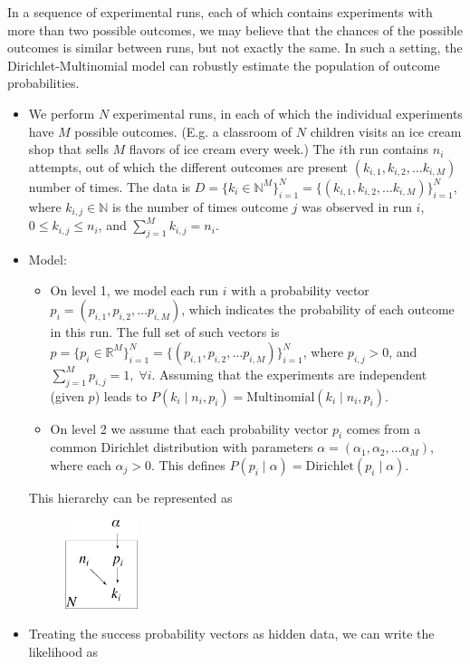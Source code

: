 In a sequence of experimental runs, each of which contains experiments with more than two possible outcomes, we may believe that the chances of the possible outcomes is similar between runs, but not exactly the same. In such a setting, the Dirichlet-Multinomial model can robustly estimate the population of outcome probabilities.
\begin{itemize}
	\item We perform $N$ experimental runs, in each of which the individual experiments have $M$ possible outcomes. (E.g. a classroom of $N$ children visits an ice cream shop that sells $M$ flavors of ice cream every week.) The $i$th run contains $n_{i}$ attempts, out of which the different outcomes are present $(k_{i,1}, k_{i,2}, \ldots k_{i,M})$ number of times. The data is $D = \{k_i\in\mathds{N}^M\}_{i=1}^N = \{(k_{i,1}, k_{i,2}, \ldots k_{i,M})\}_{i=1}^N$, where $k_{i,j}\in \mathds{N}$ is the number of times outcome $j$ was observed in run $i$, $0\leq k_{i,j} \leq n_i$, and $\sum_{j=1}^M k_{i,j} = n_i$.
	\item Model:
	\begin{itemize}
		\item On level 1, we model each run $i$ with a probability vector $p_i = (p_{i,1}, p_{i,2},\ldots p_{i,M})$, which indicates the probability of each outcome in this run. The full set of such vectors is $p = \{p_i \in \mathds{R}^{M}\}_{i=1}^N = \{(p_{i,1}, p_{i,2},\ldots p_{i,M})\}_{i=1}^N$, where $p_{i,j}>0$, and $\sum_{j=1}^M p_{i,j} = 1,\;\forall i$. Assuming that the experiments are independent (given $p$) leads to $P(k_i\;|\;n_i, p_i) = \text{Multinomial}(k_i\;|\;n_{i},p_i)$.
		\item On level 2 we assume that each probability vector $p_i$ comes from a common Dirichlet distribution with parameters $\alpha = (\alpha_1, \alpha_2, \ldots \alpha_M)$, where each $\alpha_j > 0$. This defines $P(p_i\;|\; \alpha)= \text{Dirichlet}(p_i\;|\;\alpha)$.
	\end{itemize}
	This hierarchy can be represented as 
	\begin{figure}[h!]
		\centering
			\includegraphics[height=26mm]{./figs/04-DirichletMultinomial.pdf}
		\end{figure}
	\item Treating the success probability vectors as hidden data, we can write the likelihood as

\end{itemize}
